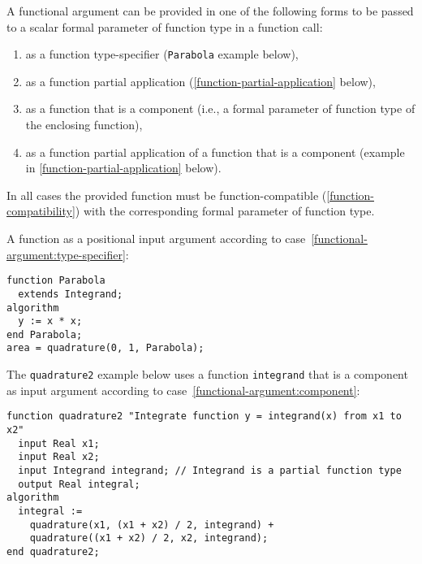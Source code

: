 A functional argument can be provided in one of the following forms to be passed to a scalar formal parameter of function type in a function call:
\begin{enumerate}
\item\label{functional-argument:type-specifier}
  as a function type-specifier (\lstinline!Parabola! example below),
\item\label{functional-argument:partial-application}
  as a function partial application (\cref{function-partial-application} below),
\item\label{functional-argument:component}
  as a function that is a component (i.e., a formal parameter of function type of the enclosing function),
\item\label{functional-argument:component-partial-application}
  as a function partial application of a function that is a component (example in \cref{function-partial-application} below).
\end{enumerate}

In all cases the provided function must be function-compatible (\cref{function-compatibility}) with the corresponding formal parameter of function type.

\begin{example}
A function as a positional input argument according to case~\ref{functional-argument:type-specifier}:
\begin{lstlisting}[language=modelica]
function Parabola
  extends Integrand;
algorithm
  y := x * x;
end Parabola;
area = quadrature(0, 1, Parabola);
\end{lstlisting}
The \lstinline!quadrature2! example below uses a function \lstinline!integrand! that is a component as input argument according to case~\ref{functional-argument:component}:
\begin{lstlisting}[language=modelica]
function quadrature2 "Integrate function y = integrand(x) from x1 to x2"
  input Real x1;
  input Real x2;
  input Integrand integrand; // Integrand is a partial function type
  output Real integral;
algorithm
  integral :=
    quadrature(x1, (x1 + x2) / 2, integrand) +
    quadrature((x1 + x2) / 2, x2, integrand);
end quadrature2;
\end{lstlisting}
\end{example}

